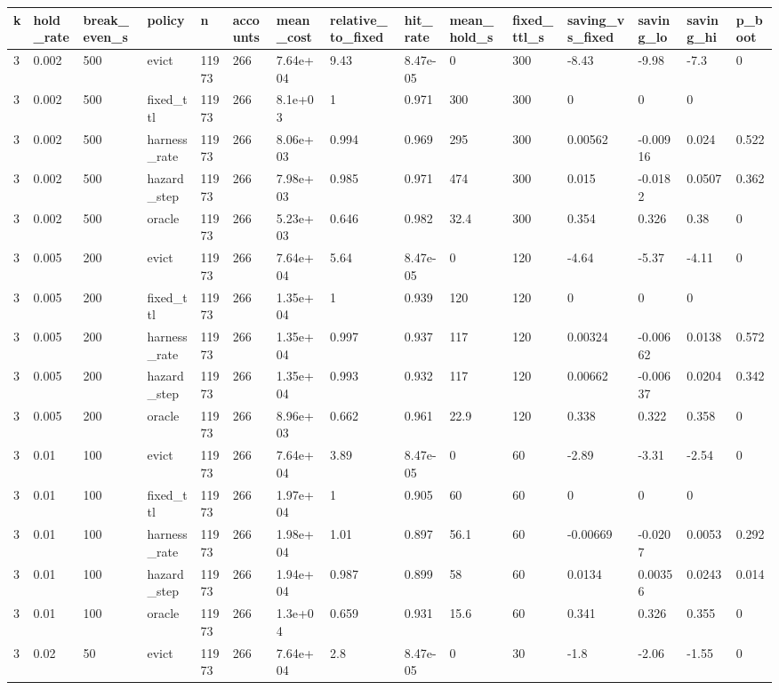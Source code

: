 \begin{tabular}{lllllllllllllll}
\toprule
k & hold\_rate & break\_even\_s & policy & n & accounts & mean\_cost & relative\_to\_fixed & hit\_rate & mean\_hold\_s & fixed\_ttl\_s & saving\_vs\_fixed & saving\_lo & saving\_hi & p\_boot \\
\midrule
3 & 0.002 & 500 & evict & 11973 & 266 & 7.64e+04 & 9.43 & 8.47e-05 & 0 & 300 & -8.43 & -9.98 & -7.3 & 0 \\
3 & 0.002 & 500 & fixed\_ttl & 11973 & 266 & 8.1e+03 & 1 & 0.971 & 300 & 300 & 0 & 0 & 0 &  \\
3 & 0.002 & 500 & harness\_rate & 11973 & 266 & 8.06e+03 & 0.994 & 0.969 & 295 & 300 & 0.00562 & -0.00916 & 0.024 & 0.522 \\
3 & 0.002 & 500 & hazard\_step & 11973 & 266 & 7.98e+03 & 0.985 & 0.971 & 474 & 300 & 0.015 & -0.0182 & 0.0507 & 0.362 \\
3 & 0.002 & 500 & oracle & 11973 & 266 & 5.23e+03 & 0.646 & 0.982 & 32.4 & 300 & 0.354 & 0.326 & 0.38 & 0 \\
3 & 0.005 & 200 & evict & 11973 & 266 & 7.64e+04 & 5.64 & 8.47e-05 & 0 & 120 & -4.64 & -5.37 & -4.11 & 0 \\
3 & 0.005 & 200 & fixed\_ttl & 11973 & 266 & 1.35e+04 & 1 & 0.939 & 120 & 120 & 0 & 0 & 0 &  \\
3 & 0.005 & 200 & harness\_rate & 11973 & 266 & 1.35e+04 & 0.997 & 0.937 & 117 & 120 & 0.00324 & -0.00662 & 0.0138 & 0.572 \\
3 & 0.005 & 200 & hazard\_step & 11973 & 266 & 1.35e+04 & 0.993 & 0.932 & 117 & 120 & 0.00662 & -0.00637 & 0.0204 & 0.342 \\
3 & 0.005 & 200 & oracle & 11973 & 266 & 8.96e+03 & 0.662 & 0.961 & 22.9 & 120 & 0.338 & 0.322 & 0.358 & 0 \\
3 & 0.01 & 100 & evict & 11973 & 266 & 7.64e+04 & 3.89 & 8.47e-05 & 0 & 60 & -2.89 & -3.31 & -2.54 & 0 \\
3 & 0.01 & 100 & fixed\_ttl & 11973 & 266 & 1.97e+04 & 1 & 0.905 & 60 & 60 & 0 & 0 & 0 &  \\
3 & 0.01 & 100 & harness\_rate & 11973 & 266 & 1.98e+04 & 1.01 & 0.897 & 56.1 & 60 & -0.00669 & -0.0207 & 0.0053 & 0.292 \\
3 & 0.01 & 100 & hazard\_step & 11973 & 266 & 1.94e+04 & 0.987 & 0.899 & 58 & 60 & 0.0134 & 0.00356 & 0.0243 & 0.014 \\
3 & 0.01 & 100 & oracle & 11973 & 266 & 1.3e+04 & 0.659 & 0.931 & 15.6 & 60 & 0.341 & 0.326 & 0.355 & 0 \\
3 & 0.02 & 50 & evict & 11973 & 266 & 7.64e+04 & 2.8 & 8.47e-05 & 0 & 30 & -1.8 & -2.06 & -1.55 & 0 \\

\end{tabular}
